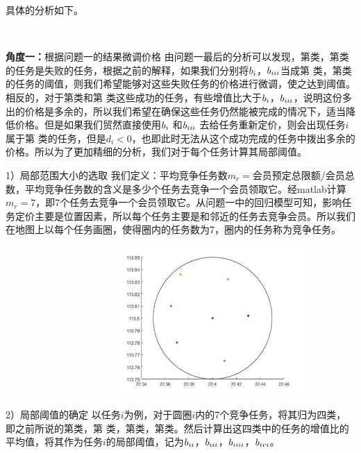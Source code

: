 \documentclass{ctexart}
\begin{document}
具体的分析如下。

\

\textbf{角度一：}根据问题一的结果微调价格
    由问题一最后的分析可以发现，第\uppercase\expandafter{}类，第\uppercase\expandafter{}类的任务是失败的任务，根据之前的解释，如果我们分别将$b_{\uppercase\expandafter{\romannumeral1}}$，$b_{\uppercase\expandafter{\romannumeral3}}$当成第
    \uppercase\expandafter{}类，第\uppercase\expandafter{}类的任务的阈值，则我们希望能够对这些失败任务的价格进行微调，使之达到阈值。相反的，对于第\uppercase\expandafter{}类和第
    \uppercase\expandafter{}类这些成功的任务，有些增值比大于$b_{\uppercase\expandafter{\romannumeral1}}$，$b_{\uppercase\expandafter{\romannumeral3}}$，说明这份多出的价格是多余的，所以我们希望在确保这些任务仍然能被完成的情况下，适当降低价格。但是如果我们贸然直接使用$b_{\uppercase\expandafter{\romannumeral1}}$ 和$b_{\uppercase\expandafter{\romannumeral3}}$ 去给任务重新定价，则会出现任务$i$属于第
    \uppercase\expandafter{}类的任务，但是$d_{i}<0$，也即此时无法从这个成功完成的任务中拨出多余的价格。所以为了更加精细的分析，我们对于每个任务计算其局部阈值。

     1）局部范围大小的选取
我们定义：平均竞争任务数$m_{r}=$会员预定总限额/会员总数，平均竞争任务数的含义是多少个任务去竞争一个会员领取它。经matlab计算$m_{r}=7$，即7个任务去竞争一个会员领取它。从问题一中的回归模型可知，影响任务定价主要是位置因素，所以每个任务主要是和邻近的任务去竞争会员。所以我们在地图上以每个任务画圈，使得圈内的任务数为7，圈内的任务称为竞争任务。

\ \ \ \ \ \ \  \ \ \ \ \ \ \ \ \  \ \  \ \ \ \  \ \includegraphics[width=7cm]{8.jpg}

2）局部阈值的确定
以任务$i$为例，对于圆圈$i$内的7个竞争任务，将其归为四类，即之前所说的第\uppercase\expandafter{}类，第\uppercase\expandafter{} 类，第\uppercase\expandafter{}类，第\uppercase\expandafter{}类。然后计算出这四类中的任务的增值比的平均值，将其作为任务$i$的局部阈值，记为$b_{\uppercase\expandafter{\romannumeral1}i}$，$b_{\uppercase\expandafter{\romannumeral2}i}$，$b_{\uppercase\expandafter{\romannumeral3}i}$，$b_{\uppercase\expandafter{\romannumeral4}i}$。
\end{document}
